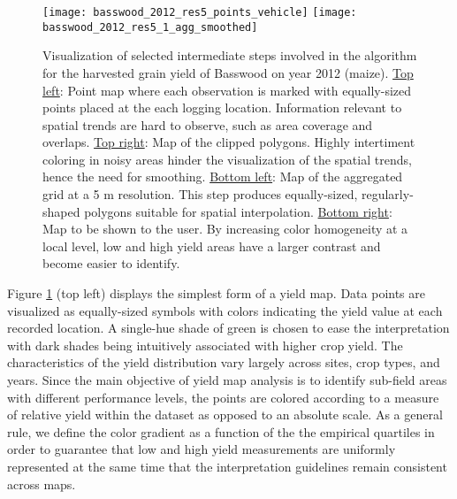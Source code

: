 \begin{figure}[h!]  \centering
  \texttt{[image: basswood\_2012\_res5\_points\_vehicle]}
  \texttt{[image: basswood\_2012\_res5\_1\_agg\_smoothed]}
  \caption[Visualization of selected algorithm steps as applied to a
  specific dataset]{Visualization of selected intermediate steps involved
    in the algorithm for the harvested grain yield of Basswood on year
    2012 (maize). \underline{Top left}: Point map where each observation is
    marked with equally-sized points placed at the each logging
    location. Information relevant to spatial trends are hard to observe,
    such as area coverage and overlaps. \underline{Top right}: Map of the
    clipped polygons. Highly intertiment coloring in noisy areas hinder
    the visualization of the spatial trends, hence the need for
    smoothing. \underline{Bottom left}: Map of the aggregated grid at a 5
    m resolution. This step produces equally-sized, regularly-shaped
    polygons suitable for spatial interpolation. \underline{Bottom right}:
    Map to be shown to the user. By increasing color homogeneity at a
    local level, low and high yield areas have a larger contrast and
    become easier to identify.}
  \label{fig:basswood2012-main-steps}
\end{figure}

 Figure \ref{fig:basswood2012-main-steps}
(top left) displays the simplest form of a yield map. Data points are
visualized as equally-sized symbols with colors indicating the yield
value at each recorded location. A single-hue shade of green is chosen
to ease the interpretation with dark shades being intuitively
associated with higher crop yield. The characteristics of the yield
distribution vary largely across sites, crop types, and years. Since
the main objective of yield map analysis is to identify sub-field
areas with different performance levels, the points are colored
according to a measure of relative yield within the dataset as opposed
to an absolute scale. As a general rule, we define the color gradient
as a function of the the empirical quartiles in order to guarantee
that low and high yield measurements are uniformly represented at the
same time that the interpretation guidelines remain consistent across
maps.

